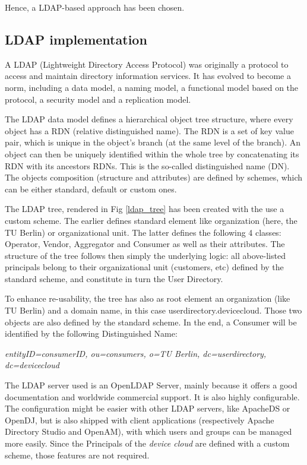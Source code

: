 Hence, a LDAP-based approach has been chosen.

\subsection{LDAP implementation}

A LDAP (Lightweight Directory Access Protocol) was originally a protocol to access and maintain directory information services. It has evolved to become a norm, including a data model, a naming model, a functional model based on the protocol, a security model and a replication model.

The LDAP data model defines a hierarchical object tree structure, where every object has a RDN (relative distinguished name). The RDN is a set of key value pair, which is unique in the  object's branch (at the same level of the branch). An object can then be uniquely identified within the whole tree by concatenating its RDN with its ancestors RDNs. This is the so-called distinguished name (DN). The objects composition (structure and attributes) are defined by schemes, which can be either standard, default or custom ones.

The LDAP tree, rendered in Fig \ref{ldap_tree} has been created with the use a custom scheme. The earlier defines standard element like organization (here, the TU Berlin) or organizational unit. The latter defines the following 4 classes: Operator, Vendor, Aggregator and Consumer as well as their attributes. The structure of the tree follows then simply the underlying logic: all above-listed principals belong to their organizational unit (customers, etc) defined by the standard scheme, and constitute in turn the User Directory.

To enhance re-usability, the tree has also as root element an organization (like TU Berlin) and a domain name, in this case userdirectory.devicecloud. Those two objects are also defined by the standard scheme. In the end, a Consumer will be identified by the following Distinguished Name:

\quad \quad \textit{entityID=consumerID, ou=consumers, o=TU Berlin, dc=userdirectory, dc=devicecloud}

The LDAP server used is an OpenLDAP Server, mainly because it offers a good documentation and worldwide commercial support. It is also highly configurable. The configuration might be easier with other LDAP servers, like ApacheDS or OpenDJ, but is also shipped with client applications (respectively Apache Directory Studio and OpenAM), with which users and groups can be  managed more easily. Since the Principals of the \emph{device cloud} are defined with a custom scheme, those features are not required.

